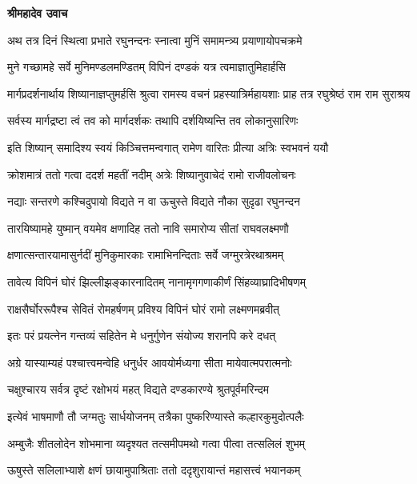 




\textbf{श्रीमहादेव उवाच}

\twolineshloka
{अथ तत्र दिनं स्थित्वा प्रभाते रघुनन्दनः}
{स्नात्वा मुनिं समामन्त्र्य प्रयाणायोपचक्रमे} %

\twolineshloka
{मुने गच्छामहे सर्वे मुनिमण्डलमण्डितम्}
{विपिनं दण्डकं यत्र त्वमाज्ञातुमिहार्हसि} %

\threelineshloka
{मार्गप्रदर्शनार्थाय शिष्यानाज्ञप्तुमर्हसि}
{श्रुत्वा रामस्य वचनं प्रहस्यात्रिर्महायशाः}
{प्राह तत्र रघुश्रेष्ठं राम राम सुराश्रय} %

\twolineshloka
{सर्वस्य मार्गद्रष्टा त्वं तव को मार्गदर्शकः}
{तथापि दर्शयिष्यन्ति तव लोकानुसारिणः} %

\twolineshloka
{इति शिष्यान् समादिश्य स्वयं किञ्चित्तमन्वगात्}
{रामेण वारितः प्रीत्या अत्रिः स्वभवनं ययौ} %

\twolineshloka
{क्रोशमात्रं ततो गत्वा ददर्श महतीं नदीम्}
{अत्रेः शिष्यानुवाचेदं रामो राजीवलोचनः} %

\twolineshloka
{नद्याः सन्तरणे कश्चिदुपायो विद्यते न वा}
{ऊचुस्ते विद्यते नौका सुदृढा रघुनन्दन} %

\twolineshloka
{तारयिष्यामहे युष्मान् वयमेव क्षणादिह}
{ततो नावि समारोप्य सीतां राघवलक्ष्मणौ} %

\twolineshloka
{क्षणात्सन्तारयामासुर्नदीं मुनिकुमारकाः}
{रामाभिनन्दिताः सर्वे जग्मुरत्रेरथाश्रमम्} %

\twolineshloka
{तावेत्य विपिनं घोरं झिल्लीझङ्कारनादितम्}
{नानामृगगणाकीर्णं सिंहव्याघ्रादिभीषणम्} %

\twolineshloka
{राक्षसैर्घोररूपैश्च सेवितं रोमहर्षणम्}
{प्रविश्य विपिनं घोरं रामो लक्ष्मणमब्रवीत्} %

\twolineshloka
{इतः परं प्रयत्नेन गन्तव्यं सहितेन मे}
{धनुर्गुणेन संयोज्य शरानपि करे दधत्} %

\twolineshloka
{अग्रे यास्याम्यहं पश्चात्त्वमन्वेहि धनुर्धर}
{आवयोर्मध्यगा सीता मायेवात्मपरात्मनोः} %

\twolineshloka
{चक्षुश्चारय सर्वत्र दृष्टं रक्षोभयं महत्}
{विद्यते दण्डकारण्ये श्रुतपूर्वमरिन्दम} %

\twolineshloka
{इत्येवं भाषमाणौ तौ जग्मतुः सार्धयोजनम्}
{तत्रैका पुष्करिण्यास्ते कल्हारकुमुदोत्पलैः} %

\twolineshloka
{अम्बुजैः शीतलोदेन शोभमाना व्यदृश्यत}
{तत्समीपमथो गत्वा पीत्वा तत्सलिलं शुभम्} %

\twolineshloka
{ऊषुस्ते सलिलाभ्याशे क्षणं छायामुपाश्रिताः}
{ततो ददृशुरायान्तं महासत्त्वं भयानकम्} %

